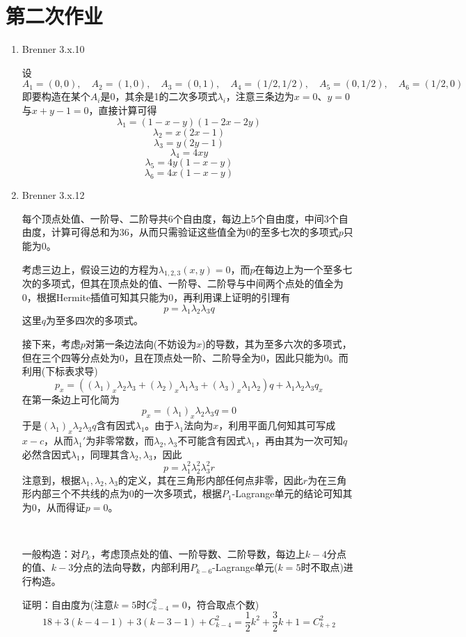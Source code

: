 \documentclass[a4paper,UTF8,fontset=windows,10pt]{ctexart}
\begin{document}
\section{第二次作业}
\begin{enumerate}
    \item Brenner 3.x.10
    
    设
    $$A_1=(0,0),\quad A_2=(1,0),\quad A_3=(0,1),\quad A_4=(1/2,1/2),\quad A_5=(0,1/2),\quad A_6=(1/2,0)$$
    即要构造在某个$A_i$是0，其余是1的二次多项式$\lambda_i$，注意三条边为$x=0$、$y=0$与$x+y-1=0$，直接计算可得
    $$\lambda_1=(1-x-y)(1-2x-2y)$$
    $$\lambda_2=x(2x-1)$$
    $$\lambda_3=y(2y-1)$$
    $$\lambda_4=4xy$$
    $$\lambda_5=4y(1-x-y)$$
    $$\lambda_6=4x(1-x-y)$$
    
    \item Brenner 3.x.12
    
    每个顶点处值、一阶导、二阶导共6个自由度，每边上5个自由度，中间3个自由度，计算可得总和为36，从而只需验证这些值全为0的至多七次的多项式$p$只能为0。
    
    考虑三边上，假设三边的方程为$\lambda_{1,2,3}(x,y)=0$，而$p$在每边上为一个至多七次的多项式，但其在顶点处的值、一阶导、二阶导与中间两个点处的值全为0，根据Hermite插值可知其只能为0，再利用课上证明的引理有
    $$p=\lambda_1\lambda_2\lambda_3q$$
    这里$q$为至多四次的多项式。
    
    接下来，考虑$p$对第一条边法向(不妨设为$x$)的导数，其为至多六次的多项式，但在三个四等分点处为0，且在顶点处一阶、二阶导全为0，因此只能为0。而利用(下标表求导)
    $$p_x=((\lambda_1)_x\lambda_2\lambda_3+(\lambda_2)_x\lambda_1\lambda_3+(\lambda_3)_x\lambda_1\lambda_2)q+\lambda_1\lambda_2\lambda_3q_x$$
    在第一条边上可化简为
    $$p_x=(\lambda_1)_x\lambda_2\lambda_3q=0$$
    于是$(\lambda_1)_x\lambda_2\lambda_3q$含有因式$\lambda_1$。由于$\lambda_1$法向为$x$，利用平面几何知其可写成$x-c$，从而$\lambda_1'$为非零常数，而$\lambda_2,\lambda_3$不可能含有因式$\lambda_1$，再由其为一次可知$q$必然含因式$\lambda_1$，同理其含$\lambda_2,\lambda_3$，因此
    $$p=\lambda_1^2\lambda_2^2\lambda_3^2r$$
    注意到，根据$\lambda_1,\lambda_2,\lambda_3$的定义，其在三角形内部任何点非零，因此$r$为在三角形内部三个不共线的点为0的一次多项式，根据$P_1$-Lagrange单元的结论可知其为0，从而得证$p=0$。
    
    \
    
    一般构造：对$P_k$，考虑顶点处的值、一阶导数、二阶导数，每边上$k-4$分点的值、$k-3$分点的法向导数，内部利用$P_{k-6}$-Lagrange单元($k=5$时不取点)进行构造。
    
    证明：自由度为(注意$k=5$时$C_{k-4}^2=0$，符合取点个数)
    $$18+3(k-4-1)+3(k-3-1)+C_{k-4}^2=\frac{1}{2}k^2+\frac{3}{2}k+1=C_{k+2}^2$$
    

\end{enumerate}
\end{document}

